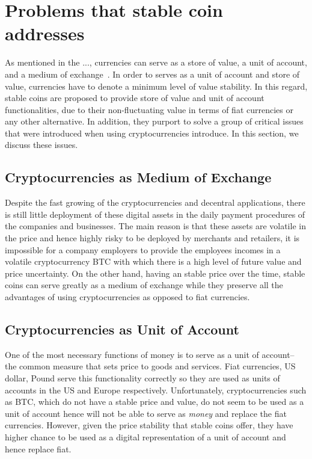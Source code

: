 \section{Problems that stable coin addresses}
As mentioned in the ..., currencies can serve as a store of value, a unit of account, and a medium of exchange~\cite{smithin2002money}. In order to serves as a unit of account and store of value, currencies have to denote a minimum level of value stability. In this regard, stable coins are proposed to provide store of value and unit of account functionalities, due to their non-fluctuating value in terms of fiat currencies or any other alternative. In addition, they purport to solve a group of critical issues that were introduced when using cryptocurrencies introduce. In this section, we discuss these issues.


\subsection{Cryptocurrencies as Medium of Exchange}
Despite the fast growing of the cryptocurrencies and decentral applications, there is still little deployment of these digital assets in the daily payment procedures of the companies and businesses. The main reason is that these assets are volatile in the price and hence highly risky to be deployed by merchants and retailers, \ie it is impossible for a company employers to provide the employees incomes in a volatile cryptocurrency \eg BTC with which there is a high level of future value and price uncertainty. On the other hand, having an stable price over the time, stable coins can serve greatly as a medium of exchange while they preserve all the advantages of using cryptocurrencies as opposed to fiat currencies. ~

\subsection{Cryptocurrencies as Unit of Account}
One of the most necessary functions of money is to serve as a unit of account-- the common measure that sets price to goods and services. Fiat currencies, \eg US dollar, Pound \etc serve this functionality correctly so they are used as units of accounts in the US and Europe respectively. Unfortunately, cryptocurrencies such as BTC, which do not have a stable price and value, do not seem to be used as a unit of account hence will not be able to serve as \textit{money} and replace the fiat currencies. However, given the price stability that stable coins offer, they have higher chance to be used as a digital representation of a unit of account and hence replace fiat.

